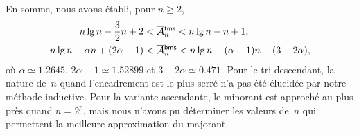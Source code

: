 
En somme, nous avons établi, pour \(n \geqslant 2\),
\begin{align*}
n\lg n - \frac{3}{2}n + 2 &< \OM{\fun{tms}}{n} < n\lg n - n + 1,\\
n\lg n - \alpha n + (2\alpha - 1) &< \OM{\fun{bms}}{n}
< n\lg n - (\alpha - 1)n - (3 - 2\alpha),
\end{align*}
où \(\alpha \simeq 1.2645\), \(2\alpha - 1 \simeq 1.52899\) et \(3 -
2\alpha \simeq 0.471\). Pour le tri descendant, la nature de~\(n\)
quand l'encadrement est le plus serré n'a pas été élucidée par notre
méthode inductive. Pour la variante ascendante, le minorant est
approché au plus près quand \(n=2^p\), mais nous n'avons pu déterminer
les valeurs de~\(n\) qui permettent la meilleure approximation du
majorant.

